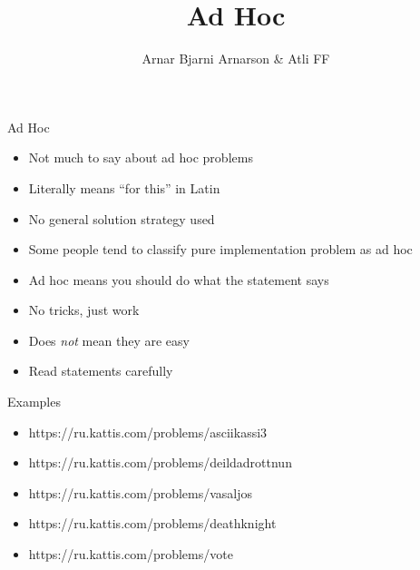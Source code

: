 \documentclass{beamer}
\title{Ad Hoc}
\author{Arnar Bjarni Arnarson \& Atli FF}
\institute{\href{http://ru.is/td}{School of Computer Science} \\[2pt] \href{http://ru.is}{Reykjavík University}}
\begin{document}
\maketitle

\begin{frame}[plain]{Ad Hoc}
    \begin{itemize}
        \item Not much to say about ad hoc problems
        \item Literally means ``for this'' in Latin
        \item No general solution strategy used
        \item Some people tend to classify pure implementation problem as ad hoc
        \item Ad hoc means you should do what the statement says
        \item No tricks, just work
        \item Does \textit{not} mean they are easy
        \item Read statements carefully
    \end{itemize}
\end{frame}

\begin{frame}[plain]{Examples}
    \begin{itemize}
        \item https://ru.kattis.com/problems/asciikassi3
        \item https://ru.kattis.com/problems/deildadrottnun
        \item https://ru.kattis.com/problems/vasaljos
        \item https://ru.kattis.com/problems/deathknight
        \item https://ru.kattis.com/problems/vote
    \end{itemize}
\end{frame}
\end{document}
